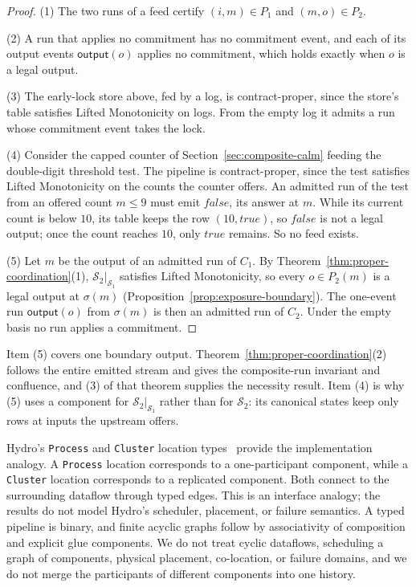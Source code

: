\documentclass[sigconf]{cidr-2027}
\theoremstyle{remark}
\newcommand{\commitment}{commitment\xspace}
\newcommand{\Spec}{\mathcal{S}}
\begin{document}
\begin{proof}
(1) The two runs of a feed certify $(i,m)\in P_1$ and $(m,o)\in P_2$.

(2) A run that applies no \commitment has no \commitment event, and each of its
output events $\mathsf{output}(o)$ applies no \commitment, which holds exactly
when $o$ is a legal output.

(3) The early-lock store above, fed by a log, is contract-proper, since the
store's table satisfies Lifted Monotonicity on logs.  From the empty log it
admits a run whose \commitment event takes the lock.

(4) Consider the capped counter of Section~\ref{sec:composite-calm} feeding
the double-digit threshold test.  The pipeline is
contract-proper, since the test satisfies Lifted Monotonicity on the counts
the counter offers.  An admitted run of the test from an offered count
$m\le 9$ must emit $\mathit{false}$, its answer at $m$.  While its current count is below
$10$, its table keeps the row $(10,\mathit{true})$, so $\mathit{false}$ is not a legal output;
once the count reaches $10$, only $\mathit{true}$ remains.  So no feed exists.

(5) Let $m$ be the output of an admitted run of $C_1$.  By
Theorem~\ref{thm:proper-coordination}(1), $\Spec_2|_{\Spec_1}$ satisfies
Lifted Monotonicity, so every $o\in P_2(m)$ is a legal output at $\sigma(m)$
(Proposition~\ref{prop:exposure-boundary}).  The one-event run
$\mathsf{output}(o)$ from $\sigma(m)$ is then an admitted run of $C_2$.
Under the empty basis no run applies a \commitment.
\end{proof}

Item (5) covers one boundary output.
Theorem~\ref{thm:proper-coordination}(2) follows the entire emitted stream
and gives the composite-run invariant and confluence, and (3) of that
theorem supplies the necessity result.  Item (4) is why (5) uses a component
for $\Spec_2|_{\Spec_1}$ rather than for $\Spec_2$: its canonical states keep
only rows at inputs the upstream offers.

Hydro's \texttt{Process} and \texttt{Cluster} location
types~\cite{hydro} provide the implementation analogy.  A \texttt{Process}
location corresponds to a one-participant component, while a
\texttt{Cluster} location corresponds to a replicated component.  Both
connect to the surrounding dataflow through typed edges.  This is an
interface analogy; the results do not model Hydro's scheduler, placement, or
failure semantics.  A typed pipeline is binary, and finite acyclic graphs
follow by associativity of composition and explicit glue components.  We do
not treat cyclic dataflows, scheduling a graph of components, physical
placement, co-location, or failure domains, and we do not merge the
participants of different components into one history.
\end{document}
